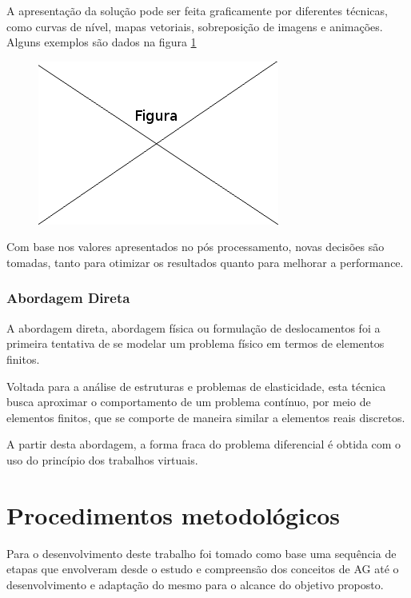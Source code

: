 \documentclass[
    12pt,               %
    openright,          %
    oneside,
    a4paper,            %
    english,            %
    french,             %
    spanish,            %
    brazil              %
    ]{abntex2}
\begin{document}
A apresentação da solução pode ser feita graficamente por diferentes técnicas, como curvas de nível, mapas vetoriais, sobreposição de imagens e animações. Alguns exemplos são dados na figura \ref{fig:graf}

\begin{figure}[!htb]
\centering
\includegraphics[scale=0.5]{figuras/temp.png}
\caption{}
\label{fig:graf}
\end{figure}

Com base nos valores apresentados no pós processamento, novas decisões são tomadas, tanto para otimizar os resultados quanto para melhorar a performance.

\subsection{Abordagem Direta \\}

A abordagem direta, abordagem física ou formulação de deslocamentos foi a primeira tentativa de se modelar um problema físico em termos de elementos finitos.

Voltada para a análise de estruturas e problemas de elasticidade, esta técnica busca aproximar o comportamento de um problema contínuo, por meio de elementos finitos, que se comporte de maneira similar a elementos reais discretos.
\cite[p. 19]{zien}

A partir desta abordagem, a forma fraca do problema diferencial é obtida com o uso do princípio dos trabalhos virtuais.
\cite[p. 20]{zien}

 






\chapter{Procedimentos metodológicos}
Para o desenvolvimento deste trabalho foi tomado como base uma sequência de etapas que envolveram desde o estudo e compreensão dos conceitos de AG até o desenvolvimento e adaptação do mesmo para o alcance do objetivo proposto.
\end{document}
